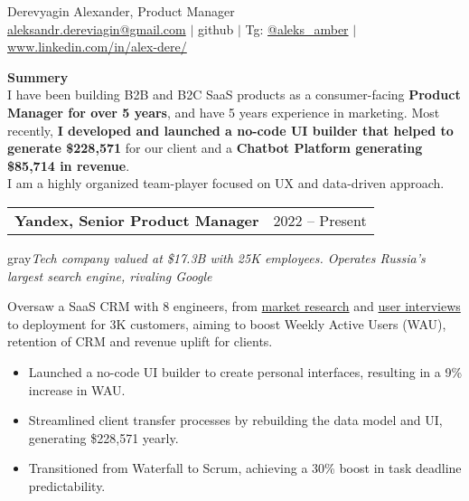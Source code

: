 \documentclass[letterpaper,11pt]{article}
\makeatletter
\newcommand{\resumeSubheading}[4]{
  \vspace{-1pt}\item
    \begin{tabular*}{\textwidth}[t]{l@{\extracolsep{\fill}}r}
      \textbf{#1} & {\small #2}\\ %
    \end{tabular*}\vspace{pt}
}
\makeatother
\begin{document}

    {\Large Derevyagin Alexander, Product Manager} \\ \vspace{5pt}
    \href{mailto:aleksandr.dereviagin@gmail.com}{aleksandr.dereviagin@gmail.com} \hspace{1pt} $|$ 
    github \hspace{1pt} $|$ 
    Tg: \href{https://t.me/aleks_amber}{@aleks\_amber}  \hspace{1pt} $|$ 
    \href{https://www.linkedin.com/in/alex-dere/}{www.linkedin.com/in/alex-dere/}
    \\ \vspace{20pt}




  \textbf{Summery}\\
  I  have been building B2B and B2C SaaS products as a consumer-facing \textbf{Product Manager for over 5 years}, and have 5 years experience in marketing. Most recently, \textbf{I developed and launched a no-code UI builder that helped to generate \$228,571 }for our client and a \textbf{Chatbot Platform generating \$85,714 in revenue}.\\
 I am a highly organized team-player focused on UX and data-driven approach.
\vspace{20pt}

\resumeSubheading
      {Yandex, Senior Product Manager}{2022 -- Present}  
\\
      
      \textcolor{gray}{\textit{Tech company valued at \$17.3B with 25K employees. Operates Russia's largest search engine, rivaling Google}}

Oversaw a SaaS CRM with 8 engineers, from \href{https://miro.com/app/board/uXjVK_QBCw0=/?moveToWidget=3458764591348909874&cot=14}{market research} and \href{https://miro.com/app/board/uXjVK_QBCw0=/?moveToWidget=3458764592116344712&cot=14}{user interviews} to deployment for 3K customers, aiming to boost Weekly Active Users (WAU), retention of CRM and revenue uplift for clients.
\begin{itemize}[itemsep=-5pt]
    \item Launched a no-code UI builder to create personal interfaces, resulting in a 9\% increase in WAU.
    \item Streamlined client transfer processes by rebuilding the data model and UI, generating \$228,571 yearly.
    \item Transitioned from Waterfall to Scrum, achieving a 30\% boost in task deadline predictability.
\end{itemize}
\vspace{20pt}
\end{document}
